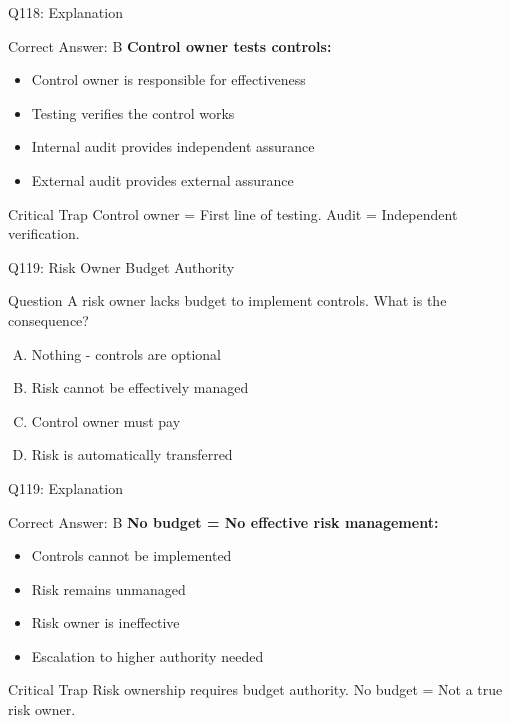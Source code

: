 \documentclass{beamer}
\begin{document}
	\begin{frame}{Q118: Explanation}
		\begin{block}{Correct Answer: B}
			\textbf{Control owner tests controls:}
			\begin{itemize}
				\item Control owner is responsible for effectiveness
				\item Testing verifies the control works
				\item Internal audit provides independent assurance
				\item External audit provides external assurance
			\end{itemize}
		\end{block}
		\begin{alertblock}{Critical Trap}
			Control owner = First line of testing.
			Audit = Independent verification.
		\end{alertblock}
	\end{frame}
	
	\begin{frame}{Q119: Risk Owner Budget Authority}
		\begin{block}{Question}
			A risk owner lacks budget to implement controls. What is the consequence?
		\end{block}
		\begin{enumerate}[(A)]
			\item Nothing - controls are optional
			\item Risk cannot be effectively managed
			\item Control owner must pay
			\item Risk is automatically transferred
		\end{enumerate}
	\end{frame}
	
	\begin{frame}{Q119: Explanation}
		\begin{block}{Correct Answer: B}
			\textbf{No budget = No effective risk management:}
			\begin{itemize}
				\item Controls cannot be implemented
				\item Risk remains unmanaged
				\item Risk owner is ineffective
				\item Escalation to higher authority needed
			\end{itemize}
		\end{block}
		\begin{alertblock}{Critical Trap}
			Risk ownership requires budget authority.
			No budget = Not a true risk owner.
		\end{alertblock}
	\end{frame}
	
\end{document}
